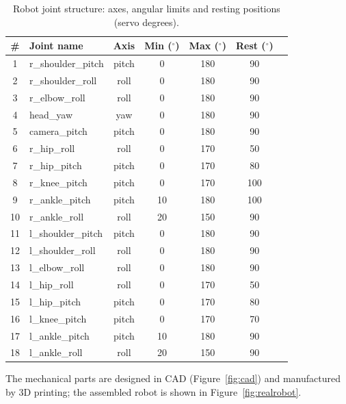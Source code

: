\begin{table}[ht]
  \centering
  \caption{Robot joint structure: axes, angular limits and resting
           positions (servo degrees).}
  \label{tab:joints}
  \small
  \setlength{\tabcolsep}{6pt}
  \renewcommand{\arraystretch}{1.12}
  \begin{tabular}{@{}clccccc@{}}
    \toprule
    \textbf{\#} & \textbf{Joint name} & \textbf{Axis} &
    \textbf{Min ($^\circ$)} & \textbf{Max ($^\circ$)} &
    \textbf{Rest ($^\circ$)} \\
    \midrule
    1  & r\_shoulder\_pitch & pitch & 0  & 180 & 90  \\
    2  & r\_shoulder\_roll  & roll  & 0  & 180 & 90  \\
    3  & r\_elbow\_roll     & roll  & 0  & 180 & 90  \\
    4  & head\_yaw          & yaw   & 0  & 180 & 90  \\
    5  & camera\_pitch      & pitch & 0  & 180 & 90  \\
    6  & r\_hip\_roll       & roll  & 0  & 170 & 50  \\
    7  & r\_hip\_pitch      & pitch & 0  & 170 & 80  \\
    8  & r\_knee\_pitch     & pitch & 0  & 170 & 100 \\
    9  & r\_ankle\_pitch    & pitch & 10 & 180 & 100 \\
    10 & r\_ankle\_roll     & roll  & 20 & 150 & 90  \\
    11 & l\_shoulder\_pitch & pitch & 0  & 180 & 90  \\
    12 & l\_shoulder\_roll  & roll  & 0  & 180 & 90  \\
    13 & l\_elbow\_roll     & roll  & 0  & 180 & 90  \\
    14 & l\_hip\_roll       & roll  & 0  & 170 & 50  \\
    15 & l\_hip\_pitch      & pitch & 0  & 170 & 80  \\
    16 & l\_knee\_pitch     & pitch & 0  & 170 & 70  \\
    17 & l\_ankle\_pitch    & pitch & 10 & 180 & 90  \\
    18 & l\_ankle\_roll     & roll  & 20 & 150 & 90  \\
    \bottomrule
  \end{tabular}
\end{table}

The mechanical parts are designed in CAD (Figure~\ref{fig:cad}) and
manufactured by 3D printing; the assembled robot is shown in
Figure~\ref{fig:realrobot}.

